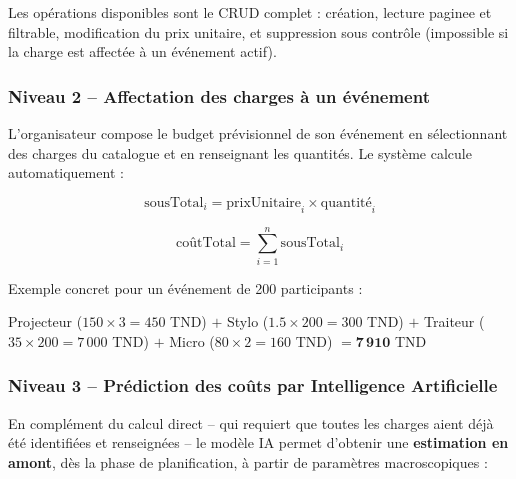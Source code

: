 \documentclass[12pt,a4paper]{report}
\begin{document}
Les op\'erations disponibles sont le CRUD complet : cr\'eation, lecture paginee et filtrable,
modification du prix unitaire, et suppression sous contr\^ole (impossible si la charge
est affect\'ee \`a un \'ev\'enement actif).

\subsubsection{Niveau 2 -- Affectation des charges \`a un \'ev\'enement}

L'organisateur compose le budget pr\'evisionnel de son \'ev\'enement en s\'electionnant
des charges du catalogue et en renseignant les quantit\'es. Le syst\`eme calcule
automatiquement :

\begin{equation}
  \text{sousTotal}_i = \text{prixUnitaire}_i \times \text{quantit\'e}_i
\end{equation}

\begin{equation}
  \text{co\^utTotal} = \sum_{i=1}^{n} \text{sousTotal}_i
\end{equation}

Exemple concret pour un \'ev\'enement de 200 participants :
\begin{center}
  Projecteur ($150 \times 3 = 450$ TND) $+$ Stylo ($1.5 \times 200 = 300$ TND) $+$
  Traiteur ($35 \times 200 = 7\,000$ TND) $+$ Micro ($80 \times 2 = 160$ TND)
  $= \mathbf{7\,910}$ TND
\end{center}

\subsubsection{Niveau 3 -- Pr\'ediction des co\^uts par Intelligence Artificielle}

En compl\'ement du calcul direct -- qui requiert que toutes les charges aient d\'ej\`a \'et\'e
identifi\'ees et renseign\'ees -- le mod\`ele IA permet d'obtenir une \textbf{estimation en
amont}, d\`es la phase de planification, \`a partir de param\`etres macroscopiques :
\end{document}
